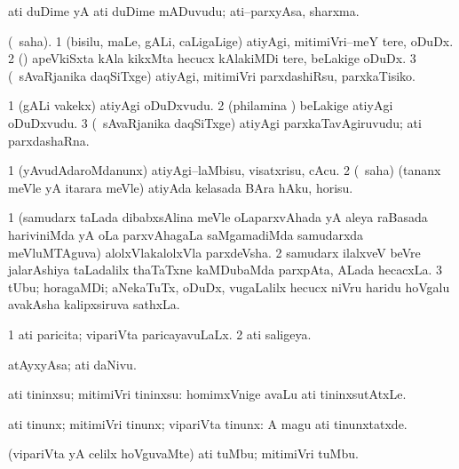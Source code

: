 \bentry
{}
\gl{\nA}
\bmng
ati duDime yA ati duDime mADuvudu; ati--parxyAsa, sharxma. 
\emng
\eentry

\bentry
{}
\gl{\sakirx}
\bmng
(\akirx\ saha). 
\bnum
\num{1} (bisilu, maLe, gALi, caLigaLige) atiyAgi, mitimiVri--meY tere, oDuDx. 
\num{2} (\CA) apeVkiSxta kAla kikxMta hecucx kAlakiMDi tere, beLakige oDuDx. 
\num{3} (\kanmu\ sAvaRjanika daqSiTxge) atiyAgi, mitimiVri parxdashiRsu, parxkaTisiko. 
\enum
\emng
\eentry

\bentry
{}
\gl{\nA}
\bmng
\bnum
\num{1} (gALi \mo vakekx) atiyAgi oDuDxvudu. 
\num{2} (philamina \vi) beLakige atiyAgi oDuDxvudu. 
\num{3} (\kanmu\ sAvaRjanika daqSiTxge) atiyAgi parxkaTavAgiruvudu; ati parxdashaRna. 
\enum
\emng
\eentry

\bentry
{}
\gl{\sakirx}
\bmng
\bnum
\num{1} (yAvudAdaroMdanunx) atiyAgi--laMbisu, visatxrisu, cAcu. 
\num{2} (\AtAmx\ saha) (tananx meVle yA itarara meVle) atiyAda kelasada BAra hAku, horisu. 
\enum
\emng
\eentry

\bentry
{}
\gl{\nA}
\bmng
\bnum
\num{1} (samudarx taLada dibabxsAlina meVle oLaparxvAhada yA aleya raBasada hariviniMda yA oLa parxvAhagaLa saMgamadiMda samudarxda meVluMTAguva) alolxVlakalolxVla parxdeVsha. 
\num{2} samudarx ilalxveV beVre jalarAshiya taLadalilx thaTaTxne kaMDubaMda parxpAta, ALada hecacxLa. 
\num{3} tUbu; horagaMDi; aNekaTuTx, oDuDx, \mo vugaLalilx hecucx niVru haridu hoVgalu avakAsha kalipxsiruva sathxLa. 
\enum
\emng
\eentry

\bentry
{}
\gl{\gu}
\bmng
\bnum
\num{1} ati paricita; vipariVta paricayavuLaLx. 
\num{2} ati saligeya. 
\enum
\emng
\eentry

\bentry
{}
\gl{\nA}
\bmng
atAyxyAsa; ati daNivu. 
\emng
\eentry

\bentry
{}
\gl{\sakirx}
\bmng
ati tininxsu; mitimiVri tininxsu:  homimxVnige avaLu ati tininxsutAtxLe. 
\emng

\noindent
\gl{\akirx}
\bmng
ati tinunx; mitimiVri tinunx; vipariVta tinunx:  A magu ati tinunxtatxde. 
\emng
\eentry

\bentry
{}
\gl{\sakirx}
\bmng
(vipariVta yA celilx hoVguvaMte) ati tuMbu; mitimiVri tuMbu. 
\emng
\eentry

